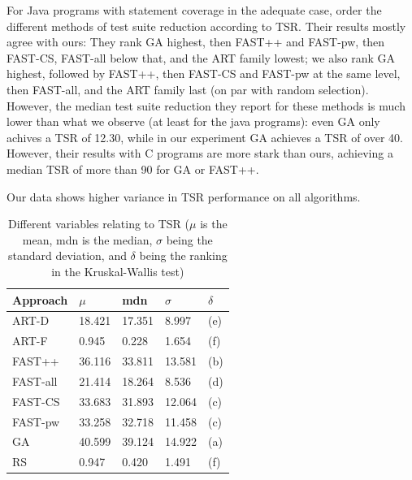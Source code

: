 For Java programs with statement coverage in the adequate case,
\cite{cruciani2019scalable} order the different methods of test suite
reduction according to TSR. Their results mostly agree with ours: They
rank GA highest, then FAST++ and FAST-pw, then FAST-CS, FAST-all below
that, and the ART family lowest; we also rank GA highest, followed by
FAST++, then FAST-CS and FAST-pw at the same level, then FAST-all, and the
ART family last (on par with random selection). However, the median test
suite reduction they report for these methods is much lower than what we
observe (at least for the java programs): even GA only achives a TSR of
12.30, while in our experiment GA achieves a TSR of over 40. However,
their results with C programs are more stark than ours, achieving a
median TSR of more than 90 for GA or FAST++.


Our data shows higher variance in TSR performance on all algorithms.

\begin{table}[htpb]
	\caption[TSR statistical results, adequate]{Different variables relating to TSR ($\mu$ is the mean, mdn is the median, $\sigma$ being the standard deviation, and $\delta$ being the ranking in the Kruskal-Wallis test)}\label{tab:tsr_stats}
	\centering
	\begin{tabular}{| l | l | l | l | l |}
	\midrule
	Approach & $\mu$ & mdn & $\sigma$ & $\delta$ \\
	\midrule
	ART-D & 18.421 & 17.351 & 8.997 & (e) \\
	ART-F & 0.945 & 0.228 & 1.654 & (f) \\
	FAST++ & 36.116 & 33.811 & 13.581 & (b) \\
	FAST-all & 21.414 & 18.264 & 8.536 & (d) \\
	FAST-CS & 33.683 & 31.893 & 12.064 & (c) \\
	FAST-pw & 33.258 & 32.718 & 11.458 & (c) \\
	GA & 40.599 & 39.124 & 14.922 & (a) \\
	RS & 0.947 & 0.420 & 1.491 & (f) \\
	\bottomrule
	\end{tabular}
\end{table}

